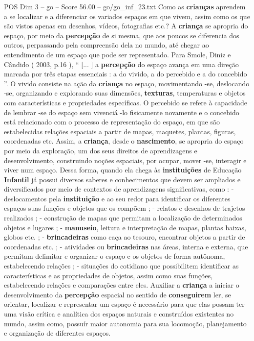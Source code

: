 \begin{textsample}{POS Dim 3 – go – Score 56.00 – go/go\_inf\_23.txt}
Como as \textbf{crianças} aprendem a se localizar e a diferenciar os variados espaços em que vivem, assim como os que são vistos apenas em desenhos, vídeos, fotografias etc.?
A \textbf{criança} se apropria do espaço, por meio da \textbf{percepção} de si mesma, que aos poucos se diferencia dos outros, perpassando pela compreensão dela no mundo, até chegar ao entendimento de um espaço que pode ser representado.
Para Smole, Diniz e Cândido ( 2003, p.16 ), “ [... ] a \textbf{percepção} do espaço avança em uma direção marcada por três etapas essenciais : a do vivido, a do percebido e a do concebido ”.
O vivido consiste na ação da \textbf{criança} no espaço, movimentando -se, deslocando -se, organizando e explorando suas dimensões, \textbf{texturas}, temperaturas e objetos com características e propriedades específicas.
O percebido se refere à capacidade de lembrar -se do espaço sem vivenciá -lo fisicamente novamente e o concebido está relacionado com o processo de representação do espaço, em que são estabelecidas relações espaciais a partir de mapas, maquetes, plantas, figuras, coordenadas etc.
Assim, a \textbf{criança}, desde o \textbf{nascimento}, se apropria do espaço por meio da exploração, um dos seus direitos de aprendizagens e desenvolvimento, construindo noções espaciais, por ocupar, mover -se, interagir e viver num espaço.
Dessa forma, quando ela chega às \textbf{instituições} de Educação \textbf{Infantil} já possui diversos saberes e conhecimentos que devem ser ampliados e diversificados por meio de contextos de aprendizagens significativas, como : - deslocamentos pela \textbf{instituição} e ao seu redor para identificar os diferentes espaços suas funções e objetos que os compõem ; - relatos e desenhos de trajetos realizados ; - construção de mapas que permitam a localização de determinados objetos e lugares ; - \textbf{manuseio}, leitura e interpretação de mapas, plantas baixas, globos etc. ; - \textbf{brincadeiras} como caça ao tesouro, encontrar objetos a partir de coordenadas etc. ; - atividades ou \textbf{brincadeiras} nas áreas, interna e externa, que permitam delimitar e organizar o espaço e os objetos de forma autônoma, estabelecendo relações ; - situações do cotidiano que possibilitem identificar as características e as propriedades de objetos, assim como suas funções, estabelecendo relações e comparações entre eles.
Auxiliar a \textbf{criança} a iniciar o desenvolvimento da \textbf{percepção} espacial no sentido de \textbf{conseguirem} ler, se orientar, localizar e representar um espaço é necessário para que elas possam ter uma visão crítica e analítica dos espaços naturais e construídos existentes no mundo, assim como, possuír maior autonomia para sua locomoção, planejamento e organização de diferentes espaços.

\end{textsample}
